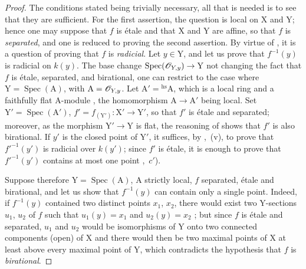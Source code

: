 
\begin{proof}
The conditions stated being trivially necessary, all that is needed is to see that they are sufficient.
For the first assertion, the question is local on $\mathrm{X}$ and $\mathrm{Y}$; hence one may suppose that $f$ is \'etale and that $\mathrm{X}$ and $\mathrm{Y}$ are affine, so that $f$ is \emph{separated}, and one is reduced to proving the second assertion.
By virtue of , it is a question of proving that $f$ is \emph{radicial}.
Let $y\in\mathrm{Y}$, and let us prove that $f^{-1}(y)$ is radicial on $k(y)$.
The base change $\operatorname{Spec}(\mathscr{O}_{Y,y})\to\mathrm{Y}$ not changing the fact that $f$ is \'etale, separated, and birational, one can restrict to the case where $\mathrm{Y}=\operatorname{Spec}(\mathrm{A})$, with $\mathrm{A}=\mathscr{O}_{Y,y}$.
Let $\mathrm{A}'={}^{\mathrm{hs}}\mathrm{A}$, which is a local ring and a faithfully flat $\mathrm{A}$-module , the homomorphism $\mathrm{A}\to\mathrm{A}'$ being local.
Set $\mathrm{Y}'=\operatorname{Spec}(\mathrm{A}')$, $f'=f_{(\mathrm{Y}')}:\mathrm{X}'\to\mathrm{Y}'$, so that $f'$ is \'etale and separated; moreover, as the morphism $\mathrm{Y}'\to\mathrm{Y}$ is flat, the reasoning of  shows that $f'$ is also birational.
If $y'$ is the closed point of $\mathrm{Y}'$, it suffices, by ,~(v), to prove that $f'^{-1}(y')$ is radicial over $k(y')$; since $f'$ is \'etale, it is enough to prove that $f'^{-1}(y')$ contains at most one point ,~$c'$).

Suppose therefore $\mathrm{Y}=\operatorname{Spec}(\mathrm{A})$, $\mathrm{A}$ strictly local, $f$ separated, \'etale and birational, and let us show that $f^{-1}(y)$ can contain only a single point.
Indeed, if $f^{-1}(y)$ contained two distinct points $x_1$, $x_2$, there would exist two $\mathrm{Y}$-sections $u_1$, $u_2$ of $f$ such that $u_1(y)=x_1$ and $u_2(y)=x_2$ ; but since $f$ is \'etale and separated, $u_1$ and $u_2$ would be isomorphisms of $\mathrm{Y}$ onto two connected components (open) of $\mathrm{X}$  and there would then be two maximal points of $\mathrm{X}$ at least above every maximal point of $\mathrm{Y}$, which contradicts the hypothesis that $f$ is \emph{birational}.
\end{proof}

